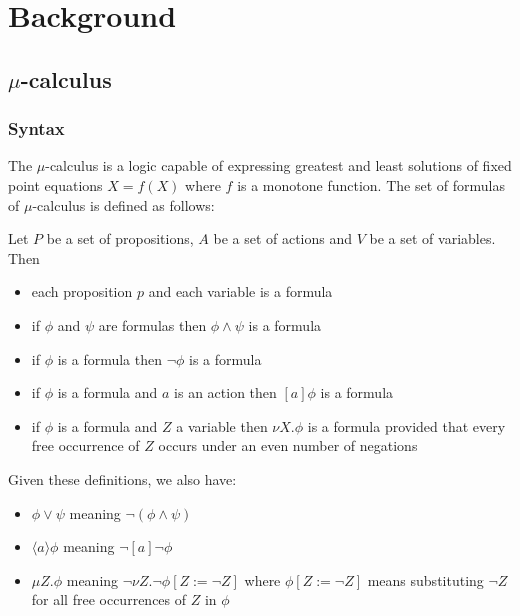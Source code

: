 \chapter{Background}

\section{$\mu$-calculus}

\subsection{Syntax}


The $\mu$-calculus is a logic capable of expressing greatest and least solutions of fixed point equations $X = f(X)$ where $f$ is a monotone function. The set of formulas of $\mu$-calculus is defined as follows:

Let $P$ be a set of propositions, $A$ be a set of actions and $V$ be a set of variables. Then
\begin{itemize}
    \item each proposition $p$ and each variable is a formula
    \item if $\phi$ and $\psi$ are formulas then $\phi \wedge \psi$ is a formula
    \item if $\phi$ is a formula then $\neg \phi$ is a formula
    \item if $\phi$ is a formula and $a$ is an action then $[a]\phi$ is a formula
    \item if $\phi$ is a formula and $Z$ a variable then $\nu X.\phi$ is a formula provided that every free occurrence of $Z$ occurs under an even number of negations
\end{itemize}

\noindent Given these definitions, we also have:
\begin{itemize}
    \item $\phi \vee \psi$ meaning $\neg (\phi \wedge \psi)$
    \item $\langle a \rangle \phi$ meaning $\neg [a] \neg \phi$
\item $\mu Z. \phi$ meaning $\neg \nu Z. \neg \phi [Z := \neg Z]$ where $\phi[Z := \neg Z]$ means substituting $\neg Z$ for all free occurrences of $Z$ in $\phi$
\end{itemize}

